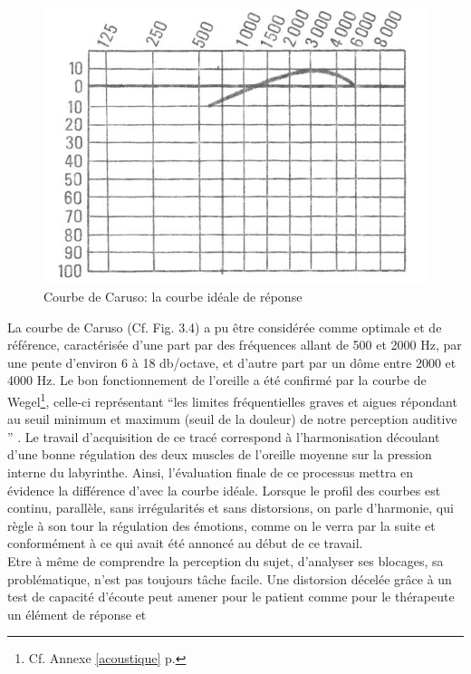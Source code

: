 \begin{center}
	\begin{figure}[h]
		\centering
		\includegraphics[width=0.7\linewidth]{images/graphiques/courbecarusoideale}	
		\caption{Courbe de Caruso: la courbe idéale de réponse \autocite{Tomatislangage} }
	\end{figure}	
\end{center}
La courbe de Caruso (Cf. Fig. 3.4) a pu être considérée comme
optimale et de référence, caractérisée d'une part par des fréquences allant de 500 et 2000
Hz, par une pente d\textquoteright environ 6 à 18 db/octave,
et d'autre part par un dôme entre 2000 et 4000 Hz.
Le bon fonctionnement de l'oreille a été confirmé par la courbe
de Wegel\footnote{Cf. Annexe \ref{acoustique} p. \pageref{acoustique}}, celle-ci représentant   \enquote 
{les limites fréquentielles graves et 
aigues répondant au seuil 
minimum et maximum (seuil de la douleur) de notre perception auditive } 
\autocite{Tomatislangage}.
 Le travail d'acquisition de ce tracé correspond à l'harmonisation
découlant d'une bonne régulation des deux muscles de l'oreille moyenne
sur la pression interne du
labyrinthe.
Ainsi, l'évaluation finale de ce processus mettra en évidence la différence
d'avec la courbe idéale.
Lorsque le profil des
courbes est continu, parallèle, sans irrégularités et sans
distorsions, on parle d'harmonie, qui règle à son tour
la régulation des émotions, comme on le verra par la suite et conformément à
ce qui avait été annoncé au début de ce travail.
 \\
Etre à même de comprendre la perception du sujet, d'analyser ses blocages, sa problématique, 
n'est pas toujours tâche facile.
 Une distorsion décelée grâce à un test 
de capacité d'écoute peut amener pour le patient comme pour le thérapeute un élément de réponse  et 
